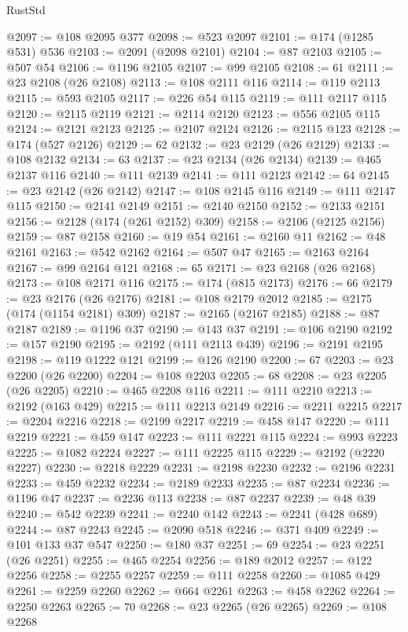 \begin{lexlean}{RustStd}
\begin{coremodule}
@2097 := @108 @2095 @377
@2098 := @523 @2097
@2101 := @174 (@1285 @531) @536
@2103 := @2091 (@2098 @2101)
@2104 := @87 @2103
@2105 := @507 @54
@2106 := @1196 @2105
@2107 := @99 @2105
@2108 := 61
@2111 := @23 @2108 (@26 @2108)
@2113 := @108 @2111 @116
@2114 := @119 @2113
@2115 := @593 @2105
@2117 := @226 @54 @115
@2119 := @111 @2117 @115
@2120 := @2115 @2119
@2121 := @2114 @2120
@2123 := @556 @2105 @115
@2124 := @2121 @2123
@2125 := @2107 @2124
@2126 := @2115 @123
@2128 := @174 (@527 @2126)
@2129 := 62
@2132 := @23 @2129 (@26 @2129)
@2133 := @108 @2132
@2134 := 63
@2137 := @23 @2134 (@26 @2134)
@2139 := @465 @2137 @116
@2140 := @111 @2139
@2141 := @111 @2123
@2142 := 64
@2145 := @23 @2142 (@26 @2142)
@2147 := @108 @2145 @116
@2149 := @111 @2147 @115
@2150 := @2141 @2149
@2151 := @2140 @2150
@2152 := @2133 @2151
@2156 := @2128 (@174 (@261 @2152) @309)
@2158 := @2106 (@2125 @2156)
@2159 := @87 @2158
@2160 := @19 @54
@2161 := @2160 @11
@2162 := @48 @2161
@2163 := @542 @2162
@2164 := @507 @47
@2165 := @2163 @2164
@2167 := @99 @2164 @121
@2168 := 65
@2171 := @23 @2168 (@26 @2168)
@2173 := @108 @2171 @116
@2175 := @174 (@815 @2173)
@2176 := 66
@2179 := @23 @2176 (@26 @2176)
@2181 := @108 @2179 @2012
@2185 := @2175 (@174 (@1154 @2181) @309)
@2187 := @2165 (@2167 @2185)
@2188 := @87 @2187
@2189 := @1196 @37
@2190 := @143 @37
@2191 := @106 @2190
@2192 := @157 @2190
@2195 := @2192 (@111 @2113 @439)
@2196 := @2191 @2195
@2198 := @119 @1222 @121
@2199 := @126 @2190
@2200 := 67
@2203 := @23 @2200 (@26 @2200)
@2204 := @108 @2203
@2205 := 68
@2208 := @23 @2205 (@26 @2205)
@2210 := @465 @2208 @116
@2211 := @111 @2210
@2213 := @2192 (@163 @429)
@2215 := @111 @2213 @2149
@2216 := @2211 @2215
@2217 := @2204 @2216
@2218 := @2199 @2217
@2219 := @458 @147
@2220 := @111 @2219
@2221 := @459 @147
@2223 := @111 @2221 @115
@2224 := @993 @2223
@2225 := @1082 @2224
@2227 := @111 @2225 @115
@2229 := @2192 (@2220 @2227)
@2230 := @2218 @2229
@2231 := @2198 @2230
@2232 := @2196 @2231
@2233 := @459 @2232
@2234 := @2189 @2233
@2235 := @87 @2234
@2236 := @1196 @47
@2237 := @2236 @113
@2238 := @87 @2237
@2239 := @48 @39
@2240 := @542 @2239
@2241 := @2240 @142
@2243 := @2241 (@428 @689)
@2244 := @87 @2243
@2245 := @2090 @518
@2246 := @371 @409
@2249 := @101 @133 @37 @547
@2250 := @180 @37
@2251 := 69
@2254 := @23 @2251 (@26 @2251)
@2255 := @465 @2254
@2256 := @189 @2012
@2257 := @122 @2256
@2258 := @2255 @2257
@2259 := @111 @2258
@2260 := @1085 @429
@2261 := @2259 @2260
@2262 := @664 @2261
@2263 := @458 @2262
@2264 := @2250 @2263
@2265 := 70
@2268 := @23 @2265 (@26 @2265)
@2269 := @108 @2268

\end{coremodule}
\end{lexlean}
